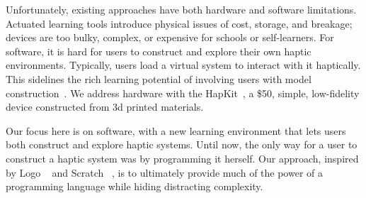 Unfortunately, %
existing approaches have %
both hardware and software limitations.
Actuated learning tools introduce physical issues of cost, storage, and breakage;
devices are  too bulky, complex, or expensive for schools or self-learners.
For software, it is hard for users to construct and explore their own haptic environments. Typically, users load a virtual system to interact with it haptically. This sidelines the rich learning potential of involving users with model construction~\cite{Papert1980}.
We address hardware with the HapKit~\cite{Martinez2016}, a \$50, simple, low-fidelity device constructed from 3d printed materials.  

Our focus here is on software, with a new learning environment that lets users both construct and explore haptic systems. Until now, the only way for a user to construct a haptic system was by programming it herself. Our approach, inspired by Logo ~\cite{Papert1980} and Scratch ~\cite{maloney2010}, is to ultimately %
provide much of the power of a programming language while hiding distracting complexity. 





%



